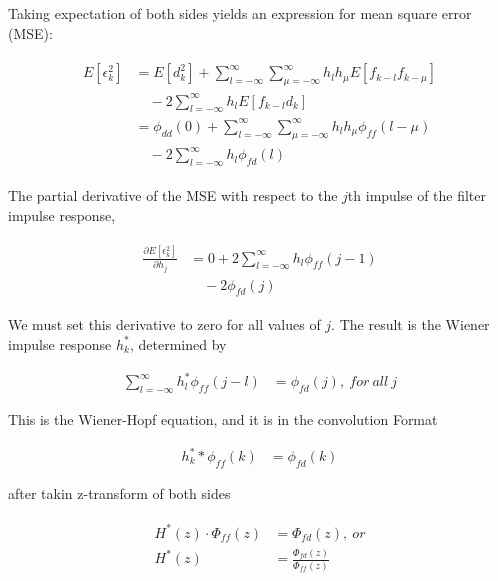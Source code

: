\documentclass[8pt,a4paper]{article}
\begin{document}
\begin{multicols}{2}
Taking expectation of both sides yields an expression for mean square error (MSE):

\begin{align}
  \begin{split}
      E \left[ \epsilon_{k}^{2} \right] &= E \left[ d_{k}^{2} \right] + \sum_{l=-\infty}^{\infty} \sum_{\mu=-\infty}^{\infty} h_{l} h_{\mu}  E \left[ f_{k-l} f_{k-\mu} \right] \\ 
      &\quad  -2 \sum_{l=-\infty}^{\infty} h_{l} E \left[ f_{k-l} d_{k}  \right] \\
      &= \phi_{dd}(0) + \sum_{l=-\infty}^{\infty} \sum_{\mu=-\infty}^{\infty} h_{l}h_{\mu} \phi_{ff}(l-\mu) \\
      &\quad  -2 \sum_{l=-\infty}^{\infty} h_{l}\phi_{fd}(l)
  \end{split}
\end{align}

The partial derivative of the MSE with respect to the $j$th impulse of the filter impulse response, 

\begin{align}
  \begin{split}
  \frac{ \partial E \left[ \epsilon_{k}^{2} \right]  }{ \partial h_{j} } &= 0 + 2 \sum_{l=-\infty}^{\infty} h_{l} \phi_{ff}(j-1) \\
  &\quad -2 \phi_{fd}(j)
  \end{split}
\end{align}

We must set this derivative to zero for all values of $j$. The result is the Wiener impulse response $h_{k}^{*}$, determined by

\begin{align}
  \sum_{l=-\infty}^{\infty} h_{l}^{*} \phi_{ff}(j-l) &= \phi_{fd}(j),\ for\ all\ j
\end{align}

This is the Wiener-Hopf equation, and it is in the convolution Format

\begin{align}
  h_{k}^{*} * \phi_{ff}(k) &= \phi_{fd}(k)
\end{align}

after takin z-transform of both sides

\begin{align}
  \begin{split}
    H^{*}(z) \cdot \Phi_{ff}(z) &= \Phi_{fd}(z),\ or \\
    H^{*}(z) &= \frac{ \Phi_{fd}(z) }{ \Phi_{ff}(z)  }
  \end{split}
\end{align}


\end{multicols}
\end{document}

